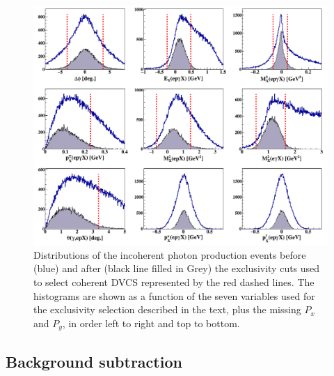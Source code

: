\documentclass{article}
\begin{document}
\begin{figure}[tbp!]
\center
\includegraphics[trim=10 10 10 
   5,clip,width=16.5cm]{fig3/all_incoh_exc_cuts.png}
\caption{Distributions of the incoherent photon production events before (blue) 
   and after (black line filled
	in Grey) the exclusivity cuts used to select coherent DVCS represented by the 
	red dashed lines. The histograms are shown as a function of the 
	seven variables used for the exclusivity selection described in the text, 
	plus the missing $P_x$ and $P_y$, in order left to right and top to bottom.}
\label{fig:IncExcCuts}
\end{figure}

\subsection{Background subtraction}
\end{document}
